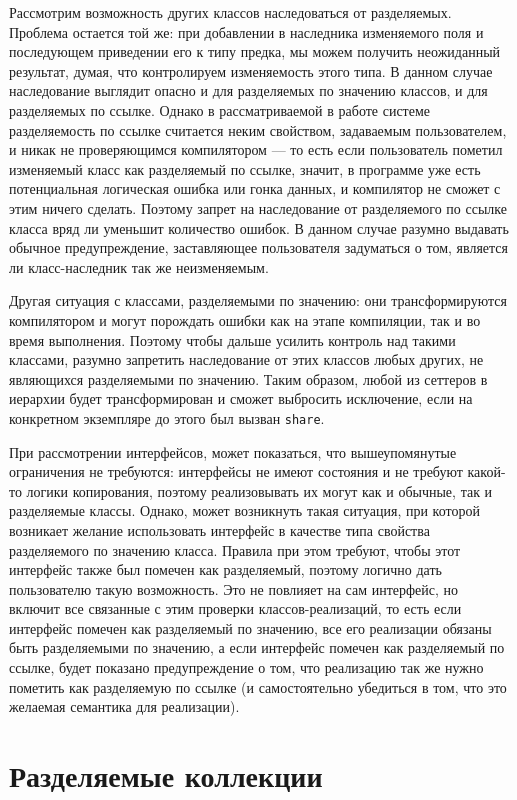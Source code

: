 \documentclass[specification,annotation,times]{itmo-student-thesis}
\begin{document}
Рассмотрим возможность других классов наследоваться от разделяемых.
Проблема остается той же: при добавлении в наследника изменяемого поля и последующем приведении его к типу предка, мы можем получить неожиданный результат, думая, что контролируем изменяемость этого типа.
 В данном случае наследование выглядит опасно и для разделяемых по значению классов, и для разделяемых по ссылке.
 Однако в рассматриваемой в работе системе разделяемость по ссылке считается неким свойством, задаваемым пользователем, и никак не проверяющимся компилятором --- то есть если пользователь пометил изменяемый класс как разделяемый по ссылке, значит, в программе уже есть потенциальная логическая ошибка или гонка данных, и компилятор не сможет с этим ничего сделать.
 Поэтому запрет на наследование от разделяемого по ссылке класса вряд ли уменьшит количество ошибок. В данном случае разумно выдавать обычное предупреждение, заставляющее пользователя задуматься о том, является ли класс-наследник так же неизменяемым.
 
 Другая ситуация с классами, разделяемыми по значению: они трансформируются компилятором и могут порождать ошибки как на этапе компиляции, так и во время выполнения.
 Поэтому чтобы дальше усилить контроль над такими классами, разумно запретить наследование от этих классов любых других, не являющихся разделяемыми по значению. Таким образом, любой из сеттеров в иерархии будет трансформирован и сможет выбросить исключение, если на конкретном экземпляре до этого был вызван \texttt{share}.
 
 При рассмотрении интерфейсов, может показаться, что вышеупомянутые ограничения не требуются: интерфейсы не имеют состояния и не требуют какой-то логики копирования, поэтому реализовывать их могут как и обычные, так и разделяемые классы.
 Однако, может возникнуть такая ситуация, при которой возникает желание использовать интерфейс в качестве типа свойства разделяемого по значению класса.
 Правила при этом требуют, чтобы этот интерфейс также был помечен как разделяемый, поэтому логично дать пользователю такую возможность.
 Это не повлияет на сам интерфейс, но включит все связанные с этим проверки классов-реализаций, то есть если интерфейс помечен как разделяемый по значению, все его реализации обязаны быть разделяемыми по значению, а если интерфейс помечен как разделяемый по ссылке, будет показано предупреждение о том, что реализацию так же нужно пометить как разделяемую по ссылке (и самостоятельно убедиться в том, что это желаемая семантика для реализации).


\section{Разделяемые коллекции}\label{collections}
\end{document}
